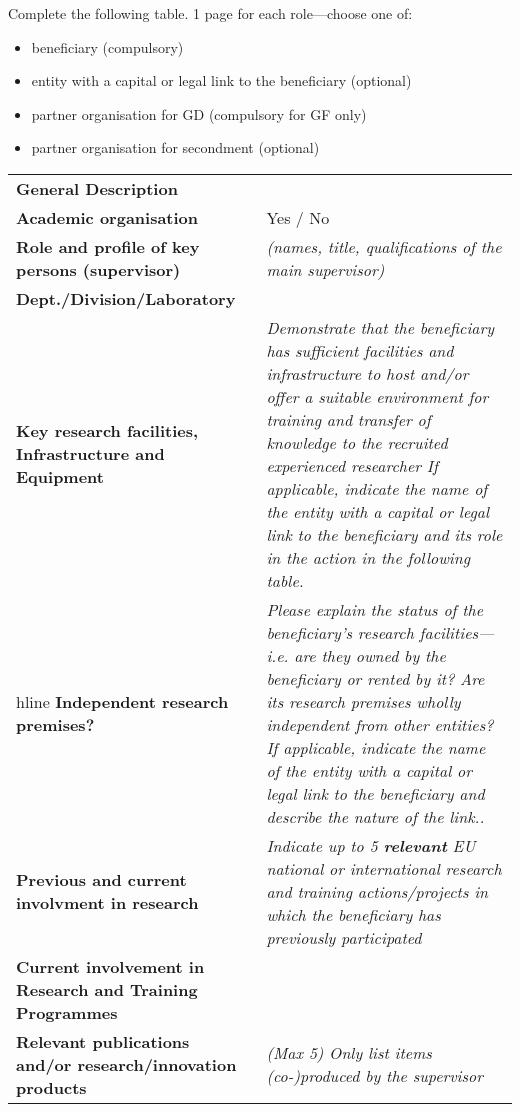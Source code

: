\noindent Complete the following table. 1 page for each
role---choose one of:
\begin{itemize}
  \item beneficiary (compulsory)
  \item entity with a capital or legal link to the beneficiary (optional)
  \item partner organisation for GD (compulsory for GF only)
  \item partner organisation for secondment (optional)

\end{itemize}
\begin{table}[h!]
{\fontsize{9bp}{1em}\selectfont %
\noindent\begin{tabular}{|>{\raggedright}p{}|p{}|}\hline
  \multicolumn{2}{|c|}{\cellcolor{gray!50}
    \textbf{[Full name + Legal Entity Short Name + Country]}
  } \\\hline
\textbf{General Description} &

\\\hline
\textbf{Academic organisation} &
  Yes / No

\\\hline
\textbf{Role and profile of key persons (supervisor)} &
{\em (names, title, qualifications of the main supervisor)}
{\em }
\\\hline
\textbf{Dept./Division/Laboratory} &

\\\hline
\textbf{Key research facilities, Infrastructure and Equipment} &
{\em
Demonstrate that the beneficiary has sufficient facilities and
infrastructure to host and/or offer a suitable environment for
training and transfer of knowledge to the recruited experienced
researcher If applicable, indicate the name of the entity with a
capital or legal link to the beneficiary and its role in the
action in the following table.
}
\\hline
\textbf{Independent research premises?} &
{\em Please explain the status of the beneficiary's research
facilities\----i.e. are they owned by the beneficiary or rented by
it? Are its research premises wholly independent from other
entities? If applicable, indicate the name of the entity with a
capital or legal link to the beneficiary and describe the nature
of the link..} 
\\\hline
\textbf{Previous and current involvment in research} &
{\em Indicate up to 5 \textbf{relevant} EU national or
international research and training actions/projects in which the
beneficiary has previously participated} \\\hline
\textbf{Current involvement in Research and Training Programmes} &
\\\hline
\textbf{Relevant publications and/or research/innovation products} &
{\em (Max 5) Only list items (co-)produced by the supervisor}
\\\hline
\end{tabular}}
\end{table}

